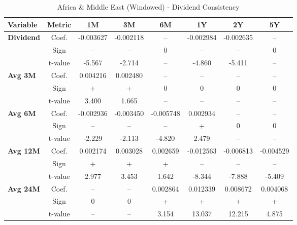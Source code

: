 \documentclass[11pt,english,a4paper,hidelinks]{book}
\begin{document}
\begin{table}[H]
    \centering
    \caption{Africa \& Middle East (Windowed) - Dividend Consistency}
    \begin{tabular}{lccccccc}
        \toprule
        \textbf{Variable} & \textbf{Metric} & \textbf{1M} & \textbf{3M} & \textbf{6M} & \textbf{1Y} & \textbf{2Y} & \textbf{5Y} \\
        \midrule
        \multirow{3}{*}{\textbf{Dividend}}
            & Coef.   & -0.003627 & -0.002118 & --        & -0.002984 & -0.002635 & --        \\
            & Sign    & –         & –         & 0         & –         & –         & 0         \\
            & t-value & -5.567    & -2.714    & --        & -4.860    & -5.411    & --        \\
        \cmidrule{1-8}
        \multirow{3}{*}{\textbf{Avg 3M}}
            & Coef.   & 0.004216  & 0.002480  & --        & --        & --        & --        \\
            & Sign    & +         & +         & 0         & 0         & 0         & 0         \\
            & t-value & 3.400     & 1.665     & --        & --        & --        & --        \\
        \cmidrule{1-8}
        \multirow{3}{*}{\textbf{Avg 6M}}
            & Coef.   & -0.002936 & -0.003450 & -0.005748 & 0.002934  & --        & --        \\
            & Sign    & –         & –         & –         & +         & 0         & 0         \\
            & t-value & -2.229    & -2.113    & -4.820    & 2.479     & --        & --        \\
        \cmidrule{1-8}
        \multirow{3}{*}{\textbf{Avg 12M}}
            & Coef.   & 0.002174  & 0.003028  & 0.002659  & -0.012563 & -0.006813 & -0.004529 \\
            & Sign    & +         & +         & +         & –         & –         & –         \\
            & t-value & 2.977     & 3.453     & 1.642     & -8.344    & -7.888    & -5.409    \\
        \cmidrule{1-8}
        \multirow{3}{*}{\textbf{Avg 24M}}
            & Coef.   & --        & --        & 0.002864  & 0.012339  & 0.008672  & 0.004068  \\
            & Sign    & 0         & 0         & +         & +         & +         & +         \\
            & t-value & --        & --        & 3.154     & 13.037    & 12.215    & 4.875     \\
        \bottomrule
    \end{tabular}
    \label{tab:africa_middle_east_dividend_consistency}
\end{table}
\end{document}
